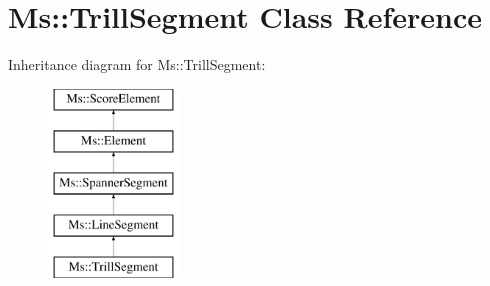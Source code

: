 \hypertarget{class_ms_1_1_trill_segment}{}\section{Ms\+:\+:Trill\+Segment Class Reference}
\label{class_ms_1_1_trill_segment}
Inheritance diagram for Ms\+:\+:Trill\+Segment\+:\begin{figure}[H]
\begin{center}
\leavevmode
\includegraphics[height=5.000000cm]{class_ms_1_1_trill_segment}
\end{center}
\end{figure}
